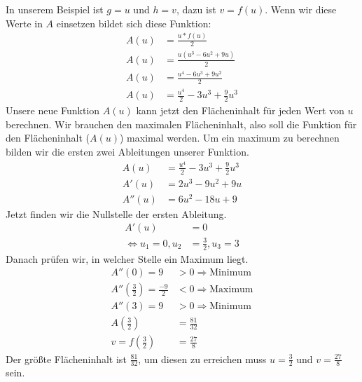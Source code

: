 \begin{flushleft}
    In unserem Beispiel ist $g=u$ und $h=v$, dazu ist $v=f(u)$.
    Wenn wir diese Werte in $A$ einsetzen bildet sich diese Funktion:
    \begin{align}
        A(u) &=\frac{u*f(u)}{2} \\
        A(u) &=\frac{u \left(u^3-6u^2+9u\right)}{2} \\
        A(u) &=\frac{u^4-6u^3+9u^2}{2} \\
        A(u) &=\frac{u^4}{2}-3u^3+\frac{9}{2}u^3
    \end{align}
    Unsere neue Funktion $A(u)$ kann jetzt den Flächeninhalt für jeden Wert von $u$ berechnen.
    Wir brauchen den maximalen Flächeninhalt, also soll die Funktion für den Flächeninhalt ($A(u)$) maximal werden.
    Um ein maximum zu berechnen bilden wir die ersten zwei Ableitungen unserer Funktion.
    \begin{align}
        A(u) &=\frac{u^4}{2}-3u^3+\frac{9}{2}u^3 \\
        A'(u) &= 2u^3-9u^2+9u \\
        A''(u) &= 6u^2-18u+9
    \end{align}
    Jetzt finden wir die Nullstelle der ersten Ableitung.
    \begin{align}
        A'(u) &=0 \\
        \iff u_1=0, u_2 &=\frac{3}{2}, u_3=3
    \end{align}
    Danach prüfen wir, in welcher Stelle ein Maximum liegt.
    \begin{align}
        A''\left(0\right) = 9 & > 0 \Longrightarrow \text{Minimum} \\
        A''\left(\frac{3}{2}\right) = \frac{-9}{2} & < 0 \Longrightarrow \text{Maximum} \\
        A''\left(3\right) = 9 & > 0 \Longrightarrow \text{Minimum} \\
        A\left(\frac{3}{2}\right) &= \frac{81}{32} \\
        v=f\left(\frac{3}{2}\right) &= \frac{27}{8}
    \end{align}
    Der größte Flächeninhalt ist $\frac{81}{32}$, um diesen zu erreichen muss $u=\frac{3}{2}$ und $v=\frac{27}{8}$ sein.
\end{flushleft}


